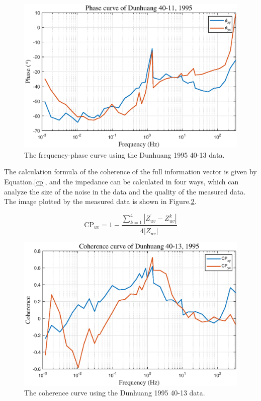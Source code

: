 \documentclass[9pt,a4paper,twoside]{rho-class/rho}
\begin{document}
\begin{figure}[htbp]
    \centering
    \includegraphics[width=0.95\columnwidth]{figures/ph40-13.eps}
    \caption{The frequency-phase curve using the Dunhuang 1995 40-13 data.}
    \label{fig:ph40-13}
\end{figure}

The calculation formula of the coherence of the full information vector is given by Equation.\eqref{cp}, and the impedance can be calculated in four ways, which can analyze the size of the noise in the data and the quality of the measured data. The image plotted by the measured data is shown in Figure.\ref{fig:cp40-13}.

\begin{equation}
    \label{cp}
    \mathrm{CP}_{uv} = 1-\dfrac{\sum^4_{k=1}|\overline{Z_{uv}}-Z_{uv}^k|}{4\overline{|Z_{uv}|}}
\end{equation}

\begin{figure}[htbp]
    \centering
    \includegraphics[width=0.95\columnwidth]{figures/cp40-13.eps}
    \caption{The coherence curve using the Dunhuang 1995 40-13 data.}
    \label{fig:cp40-13}
\end{figure}
\end{document}
